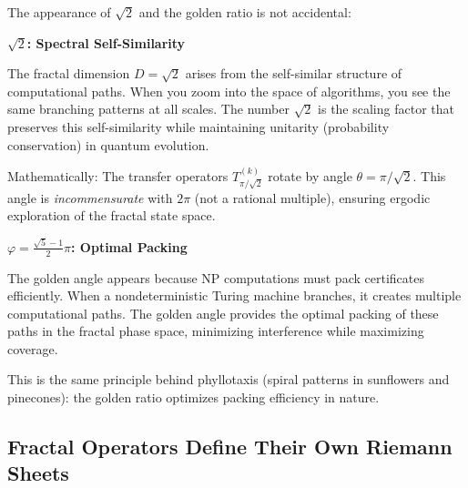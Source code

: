 \begin{level2}
The appearance of $\sqrt{2}$ and the golden ratio is not accidental:

\textbf{$\sqrt{2}$: Spectral Self-Similarity}

The fractal dimension $D = \sqrt{2}$ arises from the self-similar structure of computational paths. When you zoom into the space of algorithms, you see the same branching patterns at all scales. The number $\sqrt{2}$ is the scaling factor that preserves this self-similarity while maintaining unitarity (probability conservation) in quantum evolution.

Mathematically: The transfer operators $T^{(k)}_{\pi/\sqrt{2}}$ rotate by angle $\theta = \pi/\sqrt{2}$. This angle is \textit{incommensurate} with $2\pi$ (not a rational multiple), ensuring ergodic exploration of the fractal state space\cite{falconer2003fractal}.

\textbf{$\varphi = \frac{\sqrt{5}-1}{2}\pi$: Optimal Packing}

The golden angle appears because NP computations must pack certificates efficiently. When a nondeterministic Turing machine branches, it creates multiple computational paths. The golden angle provides the optimal packing of these paths in the fractal phase space, minimizing interference while maximizing coverage\cite{knuth1997}.

This is the same principle behind phyllotaxis (spiral patterns in sunflowers and pinecones): the golden ratio optimizes packing efficiency in nature\cite{douady1992phyllotaxis}.
\end{level2}

\subsection{Fractal Operators Define Their Own Riemann Sheets}

